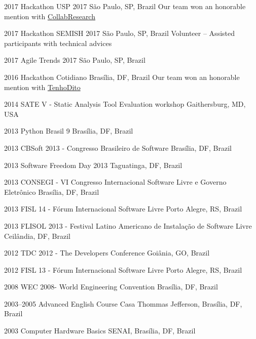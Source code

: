\documentclass[]{friggeri-cv} %
\begin{document}
\begin{entrylist}


\entry
{2017}
{Hackathon USP 2017}
{São Paulo, SP, Brazil}
  {Our team won an honorable mention with \href{https://devpost.com/software/collab-research}{CollabResearch}}

\entry
{2017}
{Hackathon SEMISH 2017}
{São Paulo, SP, Brazil}
  {Volunteer -- Assisted participants with technical advices}

\entry
{2017}
{Agile Trends 2017}
{São Paulo, SP, Brazil}
  {}

\entry
{2016}
{Hackathon Cotidiano}
{Brasília, DF, Brazil}
  {Our team won an honorable mention with \href{https://github.com/tenhodito}{TenhoDito}}

\end{entrylist}
\begin{entrylist}

\entry
{2014}
{SATE V - Static Analysis Tool Evaluation workshop}
{Gaithersburg, MD, USA}
{}

\entry
{2013}
{Python Brasil 9}
{Brasília, DF, Brazil}
{}

\entry
{2013}
{CBSoft 2013 - Congresso Brasileiro de Software}
{Brasília, DF, Brazil}
{}

\entry
{2013}
{Software Freedom Day 2013}
{Taguatinga, DF, Brazil}
{}

\entry
{2013}
{CONSEGI - VI Congresso Internacional Software Livre e Governo Eletrônico}
{Brasília, DF, Brazil}
{}

\entry
{2013}
{FISL 14 - Fórum Internacional Software Livre}
{Porto Alegre, RS, Brazil}
{}

\entry
{2013}
{FLISOL 2013 - Festival Latino Americano de Instalação de Software Livre}
{Ceilândia, DF, Brazil}
{}

\entry
{2012}
{TDC 2012 - The Developers Conference}
{Goiânia, GO, Brazil}
{}

\entry
{2012}
{FISL 13 - Fórum Internacional Software Livre}
{Porto Alegre, RS, Brazil}
{}

\entry
{2008}
{WEC  2008- World Engineering Convention}
{Brasília, DF, Brazil}
{}

\entry
{2003--2005}
{Advanced English Course}
{Casa Thommas Jefferson, Brasília, DF, Brazil}
{}

\entry
{2003}
{Computer Hardware Basics}
{SENAI, Brasília, DF, Brazil}
{}

\end{entrylist}
\end{document}
